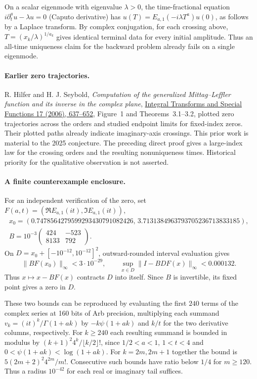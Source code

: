 \documentclass[11pt,a4paper]{article}
\numberwithin{equation}{section}
\begin{document}
On a scalar eigenmode with eigenvalue $\lambda>0$, the time-fractional
equation $i\partial_t^a u-\lambda u=0$ (Caputo derivative) has
$u(T)=E_{a,1}(-i\lambda T^a)u(0)$, as follows by a Laplace transform.
By complex conjugation, for each crossing above, $T=(x_k/\lambda)^{1/a_k}$ gives identical
terminal data for every initial amplitude. Thus an all-time uniqueness
claim for the backward problem already fails on a single eigenmode.

\paragraph{Earlier zero trajectories.}
R. Hilfer and H. J. Seybold, \emph{Computation of the generalized
Mittag--Leffler function and its inverse in the complex plane},
\href{https://doi.org/10.1080/10652460600725341}{Integral Transforms
and Special Functions 17 (2006), 637--652}, Figure~1 and
Theorems~3.1--3.2, plotted zero trajectories across the orders and
studied endpoint limits for fixed-index zeros. Their plotted paths
already indicate imaginary-axis crossings. This prior work is
material to the 2025 conjecture. The preceding direct proof gives
a large-index law for the crossing orders and the resulting
nonuniqueness times. Historical priority for the qualitative
observation is not asserted.


\paragraph{A finite counterexample enclosure.}
For an independent verification of the zero, set $F(a,t)=(\Re E_{a,1}(it),\Im E_{a,1}(it))$,
\[
 \begin{gathered}
 x_0=(0.7478564279599293430791082426,\,
       3.7131384963793705236713833185),\\
 B=10^{-3}\begin{pmatrix}424&-523\\8133&792\end{pmatrix}.
 \end{gathered}
\]
On $D=x_0+[-10^{-12},10^{-12}]^2$, outward-rounded interval evaluation gives
\[
 \|BF(x_0)\|_\infty<3\cdot10^{-29},\qquad
 \sup_{x\in D}\|I-BDF(x)\|_\infty<0.000132.
\]
Thus $x\mapsto x-BF(x)$ contracts $D$ into itself. Since $B$ is invertible, its fixed point gives a zero in $D$.

These two bounds can be reproduced by evaluating the first $240$ terms of the complex series at 160 bits of Arb precision, multiplying each summand $v_k=(it)^k/\Gamma(1+ak)$ by $-k\psi(1+ak)$ and $k/t$ for the two derivative columns, respectively. For $k\ge240$ each resulting summand is bounded in modulus by $(k+1)^2 4^k/\lfloor k/2\rfloor!$, since $1/2<a<1$, $1<t<4$ and $0<\psi(1+ak)<\log(1+ak)$. For $k=2m,2m+1$ together the bound is $5(2m+2)^2 4^{2m}/m!$. Consecutive such bounds have ratio below $1/4$ for $m\ge120$. Thus a radius $10^{-42}$ for each real or imaginary tail suffices.
\end{document}
